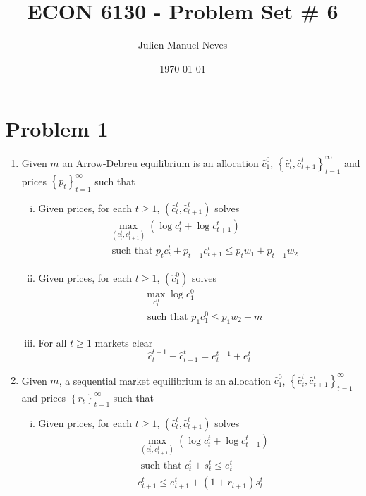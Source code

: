 \documentclass[12pt]{article}
\title{ECON 6130 - Problem Set \# 6}
\date{\today}
\author{Julien Manuel Neves}
\theoremstyle{definition}
\newcommand\st{\text{ such that }}
\newcommand{\cbra}[1]{\left\{#1\right\}}
\begin{document}
\maketitle

\section*{Problem 1}
\begin{enumerate}[(1)]
	
	\item
Given $m$ an Arrow-Debreu equilibrium is an allocation $\hat{c}_1^0$, $\cbra{\hat{c}_t^t, \hat{c}_{t+1}^t}_{t=1}^\infty$ and prices $\cbra{p_t}_{t=1}^\infty$ such that

\begin{enumerate}[(i)]
	\item Given prices, for each $t\geq 1$, $(\hat{c}_t^t, \hat{c}_{t+1}^t)$ solves
	\begin{align*}
		& \max_{({c}_t^t, {c}_{t+1}^t)} (\log{c}_t^t+ \log{c}_{t+1}^t)\\
		& \st p_t{c}_t^t +p_{t+1}{c}_{t+1}^t \leq p_tw_1 +p_{t+1}w_2
	\end{align*}
	
	\item Given prices, for each $t\geq 1$, $(\hat{c}_1^0)$ solves
	\begin{align*}
	& \max_{{c}_1^0} \log{c}_1^0\\
	& \st p_1{c}_1^0  \leq p_1w_2 +m
	\end{align*}
	
	\item For all $t\geq 1$ markets clear
	\[
	\hat{c}_t^{t-1}+ \hat{c}_{t+1}^t = e_t^{t-1}+e_t^t
	\]
\end{enumerate}

\item
Given $m$, a sequential market equilibrium is an allocation $\hat{c}_1^0$, $\cbra{\hat{c}_t^t, \hat{c}_{t+1}^t}_{t=1}^\infty$ and prices $\cbra{r_t}_{t=1}^\infty$ such that

\begin{enumerate}[(i)]
	\item Given prices, for each $t\geq 1$, $(\hat{c}_t^t, \hat{c}_{t+1}^t)$ solves
	\begin{align*}
	& \max_{({c}_t^t, {c}_{t+1}^t)} (\log{c}_t^t+ \log{c}_{t+1}^t)\\
	& \st {c}_t^t + s_t^t\leq {e}_{t}^t\\
	&  {c}_{t+1}^t \leq {e}_{t+1}^t + (1+r_{t+1})s_t^t
	\end{align*}
	

\end{enumerate}
\end{enumerate}
\end{document}
